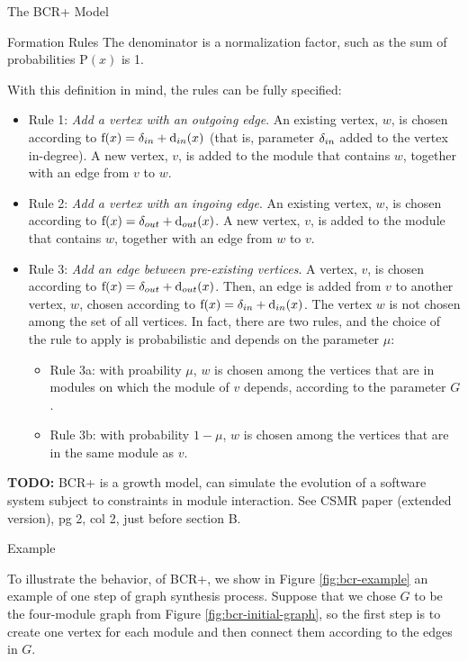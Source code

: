 \documentclass[11pt,twocolumn,a4paper,english]{article}
\newcommand{\TODO}{\textbf{TODO:} }
\begin{document}
\begin{section}{The BCR+ Model}
\begin{subsection}{Formation Rules}
	The denominator is a normalization factor, such as the sum of probabilities $\mathrm{P}(x)$ is 1.
	
	With this definition in mind, the rules can be fully specified:
	
	\begin{itemize}
		\item Rule 1: \emph{Add a vertex with an outgoing edge}. An existing vertex, $w$, is chosen according to $\mathrm{f}(x) = \delta_{in} + \mathrm{d}_{in}(x)$ (that is, parameter $\delta_{in}$ added to the vertex in-degree). A new vertex, $v$, is added to the module that contains $w$, together with an edge from $v$ to $w$.

		\item Rule 2: \emph{Add a vertex with an ingoing edge}. An existing vertex, $w$, is chosen according to $\mathrm{f}(x) = \delta_{out} + \mathrm{d}_{out}(x)$. A new vertex, $v$, is added to the module that contains $w$, together with an edge from $w$ to $v$.

		\item Rule 3: \emph{Add an edge between pre-existing vertices}. A vertex, $v$, is chosen according to $\mathrm{f}(x) = \delta_{out} + \mathrm{d}_{out}(x)$. Then, an edge is added from $v$ to another vertex, $w$, chosen according to $\mathrm{f}(x) = \delta_{in} + \mathrm{d}_{in}(x)$. The vertex $w$ is not chosen among the set of all vertices. In fact, there are two rules, and the choice of the rule to apply is probabilistic and depends on the parameter $\mu$:

		\begin{itemize}
		  \item Rule 3a: with proability $\mu$, $w$ is chosen among the vertices that are in modules on which the module of $v$ depends, according to the parameter $G$.
		  \item Rule 3b: with probability $1 - \mu$, $w$ is chosen among the vertices that are in the same module as $v$.
		\end{itemize}
	\end{itemize}
	
	\TODO BCR+ is a growth model, can simulate the evolution of a software system subject to constraints in module interaction. See CSMR paper (extended version), pg 2, col 2, just before section B. 
	
\end{subsection}

\begin{subsection}{Example}
	
	To illustrate the behavior, of BCR+, we show in Figure \ref{fig:bcr-example} an example of one step of graph synthesis process. Suppose that we chose $G$ to be the four-module graph from Figure \ref{fig:bcr-initial-graph}, so the first step is to create one vertex for each module and then connect them according to the edges in $G$. 
	

\end{subsection}
\end{section}
\end{document}
